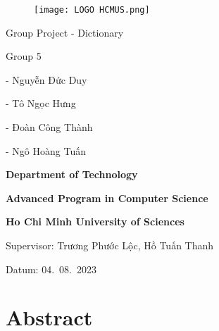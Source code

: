 \documentclass[sn-mathphys,Numbered]{sn-jnl}%
\begin{document}
	
\thispagestyle{empty}

\noindent
\begin{figure}[H]
	\centering
	\texttt{[image: LOGO HCMUS.png]}
\end{figure}

\vspace{1.5cm}

\noindent
{\sffamily\fontsize{30}{35}\selectfont Group Project - Dictionary\par}

\vspace{0.5cm}

\noindent
\textcolor{solarized@cyan}{\sffamily\large Group 5}

 - \foreignlanguage{vietnamese}{Nguyễn Đức Duy}

 - \foreignlanguage{vietnamese}{Tô Ngọc Hưng}

 - \foreignlanguage{vietnamese}{Đoàn Công Thành}

 - \foreignlanguage{vietnamese}{Ngô Hoàng Tuấn}

\vspace{3cm}

\begin{flushright}
	\sffamily\textbf{Department of Technology}
	\vspace{-4px}
	
	\textbf{Advanced Program in Computer Science}
	\vspace{-4px}
	
	\textbf{Ho Chi Minh University of Sciences}
	\vspace{0px}
	\vfill

	Supervisor: \foreignlanguage{vietnamese}{Trương Phước Lộc}, \foreignlanguage{vietnamese}{Hồ Tuấn Thanh}
	
	\vspace{\baselineskip}

	Datum: 04.~08.~2023
\end{flushright}

\newpage



\normalfont

\tableofcontents


\section{Abstract}
\end{document}
